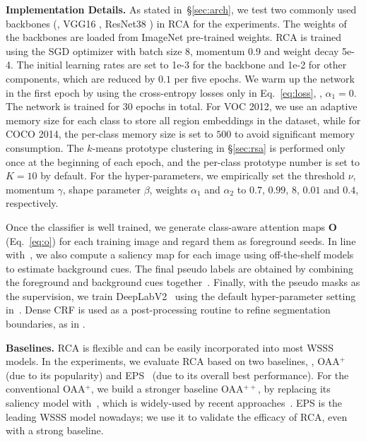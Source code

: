 \documentclass[10pt,twocolumn,letterpaper]{article}
\begin{document}
\noindent\textbf{Implementation Details.} As stated in~\S\ref{sec:arch}, we test two commonly used backbones (\ie, VGG16 \cite{simonyan2014very}, ResNet38 \cite{he2016deep}) in RCA for the experiments. The weights of the backbones are loaded from ImageNet pre-trained weights. RCA is trained using the SGD optimizer with batch size {$8$}, momentum {$0.9$} and weight decay 5e-4. The initial learning rates are set to 1e-3 for the backbone and 1e-2 for other components, which are reduced by $0.1$ per five epochs. We warm up the network in the first epoch by  using the cross-entropy losses only in Eq.~\ref{eq:loss}, \ie, $\alpha_1=0$. The network is trained  for $30$ epochs in total.  For VOC 2012, we use an adaptive memory size for each class to store all region embeddings in the dataset, while for COCO 2014, the per-class memory size is set to $500$ to avoid significant memory consumption. The $k$-means prototype clustering in \S\ref{sec:rsa} is performed only once at the beginning of each epoch, and the per-class  prototype number is set to $K\!=\!10$ by default. For the hyper-parameters, we empirically set the threshold $\nu$,  momentum $\gamma$, shape parameter $\beta$,  weights $\alpha_1$ and $\alpha_2$ to {$0.7$}, {$0.99$}, $8$, $0.01$ and {$0.4$}, respectively. 


Once the classifier is well trained, we generate class-aware attention maps $\bm{O}$ (Eq.~\ref{eq:o}) for each training image and regard them as foreground seeds. In line with~\cite{wu2021embedded,xu2021leveraging,lee2021railroad,jiang2019integral,li2021group}, we also compute a saliency map for each image using off-the-shelf models to estimate background cues. The final pseudo labels are obtained by combining the foreground and background cues together~\cite{jiang2019integral,li2021group}. Finally, with the pseudo masks as the supervision, we train  DeepLabV2~\cite{chen2017deeplab} using  the default hyper-parameter setting in~\cite{chen2017deeplab}. Dense CRF \cite{krahenbuhl2011efficient} is used as a post-processing routine to refine segmentation boundaries, as in \cite{lee2021railroad,wu2021embedded,li2021pseudo,xu2021leveraging,zhang2021complementary}.





\noindent\textbf{Baselines.} 
RCA is flexible and can be easily incorporated into most  WSSS models. In the experiments, we evaluate RCA based on two baselines, \ie, OAA$^{+}$~\cite{jiang2019integral} (due to its popularity) and EPS~\cite{lee2021railroad} (due to its overall best performance). For the conventional OAA$^{+}$, we build a stronger baseline OAA$^{++}$, by replacing its  saliency model with~\cite{liu2019simple}, which is widely-used by recent approaches~\cite{wu2021embedded,xu2021leveraging}.  EPS is the leading WSSS model nowadays; we use it to validate the efficacy of RCA, even with a strong baseline. 
\end{document}
